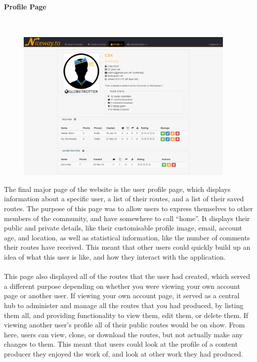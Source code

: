 \newpage 
\paragraph{Profile Page}\ \\

\begin{figure}[!ht]
	\vspace{-5mm}
	\begin{center}
		\includegraphics[width=0.95\textwidth]{images/design/profile.png}
	\end{center}
	\vspace{-5mm}
\end{figure}
\noindent 
The final major page of the website is the user profile page, which displays information about a specific user, a list of their routes, and a list of their saved routes. The purpose of this page was to allow users to express themselves to other members of the community, and have somewhere to call ``home''. It displays their public and private details, like their customisable profile image, email, account age, and location, as well as statistical information, like the number of comments their routes have received. This meant that other users could quickly build up an idea of what this user is like, and how they interact with the application.\ \\
\ \\
This page also displayed all of the routes that the user had created, which served a different purpose depending on whether you were viewing your own account page or another user. If viewing your own account page, it served as a central hub to administer and manage all the routes that you had produced, by listing them all, and providing functionality to view them, edit them, or delete them. If viewing another user's profile all of their public routes would be on show. From here, users can view, clone, or download the routes, but not actually make any changes to them. This meant that users could look at the profile of a content producer they enjoyed the work of, and look at other work they had produced. 


